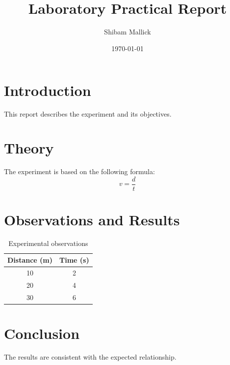 \documentclass[12pt,a4paper]{report}
\title{Laboratory Practical Report}
\author{Shibam Mallick}
\date{\today}
\begin{document}
\maketitle
\tableofcontents

\chapter{Introduction}
This report describes the experiment
and its objectives.

\chapter{Theory}
The experiment is based on
the following formula:
\[
v = \frac{d}{t}
\]

\chapter{Observations and Results}

\begin{table}[h]
\centering
\begin{tabular}{|c|c|}
\hline
Distance (m) & Time (s) \\
\hline
10 & 2 \\
20 & 4 \\
30 & 6 \\
\hline
\end{tabular}
\caption{Experimental observations}
\end{table}

\chapter{Conclusion}
The results are consistent
with the expected relationship.
\end{document}
